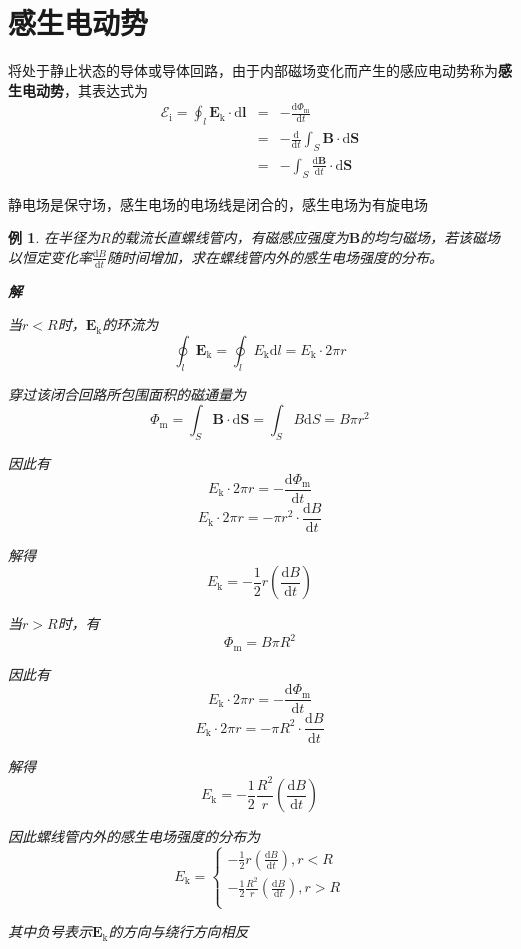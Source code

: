 \documentclass[12pt, a4paper, twoside]{ctexbook}
\newtheorem{example}[theorem]{例}
\begin{document}
\section{感生电动势}
将处于静止状态的导体或导体回路，由于内部磁场变化而产生的感应电动势称为\textbf{感生电动势}，其表达式为
\begin{eqnarray}
    \mathscr{E}_\mathrm{i}=\oint_l \boldsymbol{E}_\mathrm{k}\cdot\mathrm{d}\boldsymbol{l}&=&-\frac{\mathrm{d}\varPhi_\mathrm{m}}{\mathrm{d}t} \nonumber \\
    ~&=&-\frac{\mathrm{d}}{\mathrm{d}t}\int_S\boldsymbol{B}\cdot\mathrm{d}\boldsymbol{S} \nonumber \\
    ~&=&-\int_S\frac{\mathrm{d}\boldsymbol{B}}{\mathrm{d}t}\cdot\mathrm{d}\boldsymbol{S} \nonumber
\end{eqnarray}

静电场是保守场，感生电场的电场线是闭合的，感生电场为有旋电场
\begin{example}
    在半径为$R$的载流长直螺线管内，有磁感应强度为$\boldsymbol{B}$的均匀磁场，若该磁场以恒定变化率$\frac{\mathrm{d}B}{\mathrm{d}t}$随时间增加，求在螺线管内外的感生电场强度的分布。

    \noindent\textbf{解}

    当$r<R$时，$\boldsymbol{E}_\mathrm{k}$的环流为
    $$
    \oint_l \boldsymbol{E}_\mathrm{k}=\oint_l E_\mathrm{k}\mathrm{d}l=E_\mathrm{k}\cdot2\pi r
    $$

    穿过该闭合回路所包围面积的磁通量为
    $$
    \varPhi_\mathrm{m}=\int_S \boldsymbol{B}\cdot\mathrm{d}\boldsymbol{S}=\int_S B\mathrm{d}S=B\pi r^2
    $$

    因此有
    $$
    E_\mathrm{k}\cdot2\pi r=-\frac{\mathrm{d}\varPhi_\mathrm{m}}{\mathrm{d}t}
    $$
    $$
    E_\mathrm{k}\cdot2\pi r=-\pi r^2\cdot\frac{\mathrm{d}B}{\mathrm{d}t}
    $$
    
    解得
    $$
    E_\mathrm{k}=-\frac{1}{2}r\left(\frac{\mathrm{d}B}{\mathrm{d}t}\right)
    $$

    当$r>R$时，有
    $$
    \varPhi_\mathrm{m}=B\pi R^2
    $$

    因此有
    $$
    E_\mathrm{k}\cdot2\pi r=-\frac{\mathrm{d}\varPhi_\mathrm{m}}{\mathrm{d}t}
    $$
    $$
    E_\mathrm{k}\cdot2\pi r=-\pi R^2\cdot\frac{\mathrm{d}B}{\mathrm{d}t}
    $$

    解得
    $$
    E_\mathrm{k}=-\frac{1}{2}\frac{R^2}{r}\left(\frac{\mathrm{d}B}{\mathrm{d}t}\right)
    $$

    因此螺线管内外的感生电场强度的分布为
    $$
    E_{\mathrm{k}}=\left\{ \begin{array}{l}
        -\frac{1}{2}r\left( \frac{\mathrm{d}B}{\mathrm{d}t} \right) ,r<R\\
        -\frac{1}{2}\frac{R^2}{r}\left( \frac{\mathrm{d}B}{\mathrm{d}t} \right) ,r>R\\
    \end{array} \right. 
    $$

    其中负号表示$\boldsymbol{E}_\mathrm{k}$的方向与绕行方向相反
\end{example}
\end{document}
